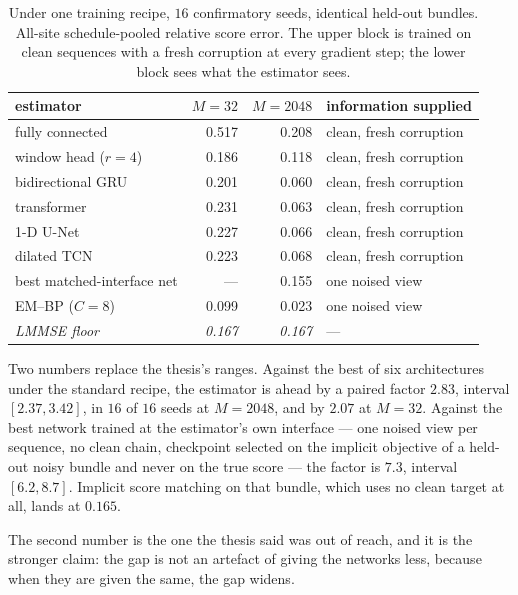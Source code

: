 \documentclass[11pt,a4paper]{article}
\begin{document}
\begin{table}[htbp]
\centering
\small
\caption{Under one training recipe, $16$ confirmatory seeds, identical held-out bundles. All-site
schedule-pooled relative score error. The upper block is trained on clean sequences with a fresh
corruption at every gradient step; the lower block sees what the estimator sees.}
\label{tab:baselines}
\begin{tabular}{l dd l}
\toprule
estimator & $M=32$ & $M=2048$ & information supplied \\
\midrule
fully connected              & 0.517 & 0.208 & clean, fresh corruption \\
window head ($r=4$)          & 0.186 & 0.118 & clean, fresh corruption \\
bidirectional GRU            & 0.201 & 0.060 & clean, fresh corruption \\
transformer                  & 0.231 & 0.063 & clean, fresh corruption \\
1-D U-Net                    & 0.227 & 0.066 & clean, fresh corruption \\
dilated TCN                  & 0.223 & 0.068 & clean, fresh corruption \\
\midrule
best matched-interface net   & ---   & 0.155 & one noised view \\
EM--BP ($C=8$)               & 0.099 & 0.023 & one noised view \\
\midrule
\textit{LMMSE floor}         & \textit{0.167} & \textit{0.167} & --- \\
\bottomrule
\end{tabular}
\end{table}

Two numbers replace the thesis's ranges. Against the best of six architectures under the standard
recipe, the estimator is ahead by a paired factor $2.83$, interval $[2.37,3.42]$, in $16$ of $16$
seeds at $M=2048$, and by $2.07$ at $M=32$. Against the best network trained at the estimator's own
interface --- one noised view per sequence, no clean chain, checkpoint selected on the implicit
objective of a held-out noisy bundle and never on the true score --- the factor is $7.3$, interval
$[6.2,8.7]$. Implicit score matching on that bundle, which uses no clean target at all, lands at
$0.165$.

The second number is the one the thesis said was out of reach, and it is the stronger claim: the
gap is not an artefact of giving the networks less, because when they are given the same, the gap
widens.
\end{document}
